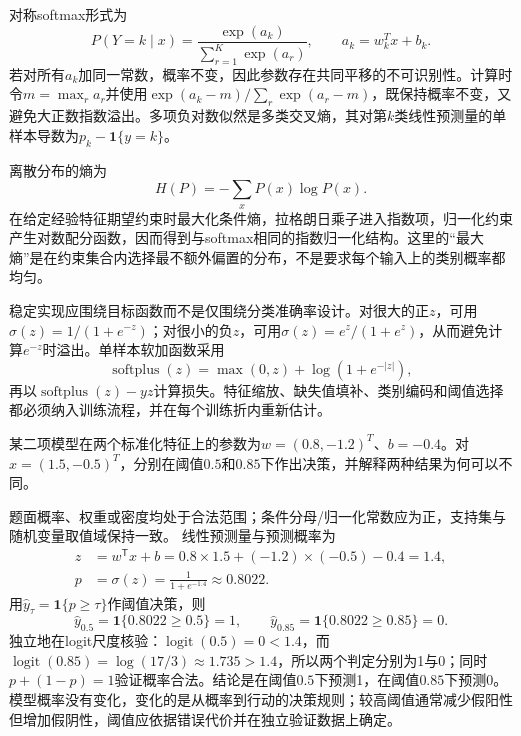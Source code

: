 对称softmax形式为
\[
P(Y=k\mid x)=\frac{\exp(a_k)}{\sum_{r=1}^{K}\exp(a_r)},
\qquad a_k=w_k^Tx+b_k.
\]
若对所有$a_k$加同一常数，概率不变，因此参数存在共同平移的不可识别性。计算时令$m=\max_r a_r$并使用$\exp(a_k-m)/\sum_r\exp(a_r-m)$，既保持概率不变，又避免大正数指数溢出。多项负对数似然是多类交叉熵，其对第$k$类线性预测量的单样本导数为$p_k-\mathbf1\{y=k\}$。

离散分布的熵为
\[
H(P)=-\sum_xP(x)\log P(x).
\]
在给定经验特征期望约束时最大化条件熵，拉格朗日乘子进入指数项，归一化约束产生对数配分函数，因而得到与softmax相同的指数归一化结构。这里的“最大熵”是在约束集合内选择最不额外偏置的分布，不是要求每个输入上的类别概率都均匀。


稳定实现应围绕目标函数而不是仅围绕分类准确率设计。对很大的正$z$，可用$\sigma(z)=1/(1+e^{-z})$；对很小的负$z$，可用$\sigma(z)=e^z/(1+e^z)$，从而避免计算$e^{-z}$时溢出。单样本软加函数采用
\[
\operatorname{softplus}(z)=\max(0,z)+\log(1+e^{-|z|}),
\]
再以$\operatorname{softplus}(z)-yz$计算损失。特征缩放、缺失值填补、类别编码和阈值选择都必须纳入训练流程，并在每个训练折内重新估计。

\label{struct:V2-C05-CH18}
\label{struct:V2-C05-CH32}
\begin{example}[一次概率预测与阈值决策]\label{exm:V2-C05-decision}
某二项模型在两个标准化特征上的参数为$w=(0.8,-1.2)^T$、$b=-0.4$。对$x=(1.5,-0.5)^T$，分别在阈值$0.5$和$0.85$下作出决策，并解释两种结果为何可以不同。

\label{struct:V2-C05-CH33}
\end{example}
\begin{solution}
\SolGiven 题面概率、权重或密度均处于合法范围；条件分母/归一化常数应为正，支持集与随机变量取值域保持一致。
\SolDerive
线性预测量与预测概率为
\[
\begin{aligned}
z&=w^{\mathsf T}x+b
=0.8\times1.5+(-1.2)\times(-0.5)-0.4
=1.4,\\
p&=\sigma(z)=\frac{1}{1+e^{-1.4}}\approx0.8022.
\end{aligned}
\]
用$\widehat y_\tau=\mathbf1\{p\geq\tau\}$作阈值决策，则
\[
\widehat y_{0.5}=\mathbf1\{0.8022\geq0.5\}=1,
\qquad
\widehat y_{0.85}=\mathbf1\{0.8022\geq0.85\}=0.
\]
独立地在logit尺度核验：$\operatorname{logit}(0.5)=0<1.4$，而$\operatorname{logit}(0.85)=\log(17/3)\approx1.735>1.4$，所以两个判定分别为1与0；同时$p+(1-p)=1$验证概率合法。结论是在阈值$0.5$下预测1，在阈值$0.85$下预测0。模型概率没有变化，变化的是从概率到行动的决策规则；较高阈值通常减少假阳性但增加假阴性，阈值应依据错误代价并在独立验证数据上确定。
\end{solution}

